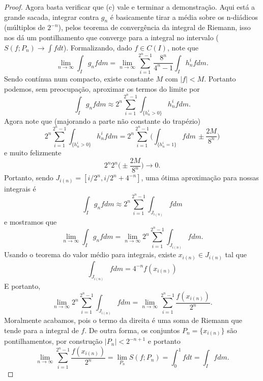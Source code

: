 \begin{proof}
    Agora basta verificar que (c) vale e terminar a demonstração. Aqui está a grande sacada, integrar contra $g_n$ é basicamente tirar a média 
    sobre os n-diádicos (múltiplos de $2^{-n}$), pelos teorema de convergência da integral de Riemann, isso nos dá um pontilhamento que converge para 
    a integral no intervalo ($S(f;P_n) \to \int f dt$).  Formalizando, dado $f \in C(I)$, note que
    $$\lim_{n\to\infty} \int_I g_nf dm = \lim_{n\to\infty} \sum_{i=1}^{2^n - 1} \frac{8^n}{4^n - 1} \int_I h_n^i fdm.$$
    Sendo contínua num compacto, existe constante $M$ com $|f| < M$. Portanto podemos, sem preocupação, aproximar os termos do limite por 
    $$\int_I g_nf dm \approx 2^n \sum_{i=1}^{2^n - 1} \int_{\{h_n^i > 0\}} h_n^i fdm.$$
    Agora note que (majorando a parte não constante do trapézio)
    $$2^n \sum_{i=1}^{2^n - 1} \int_{\{h_n^i > 0\}} h_n^i fdm = 2^n  \sum_{i=1}^{2^n - 1} \bigg(\int_{\{h_n^i = 1\}} f dm \,\pm \frac{2M}{8^{n}} \bigg)$$
    e muito felizmente
    $$2^n 2^n \bigg( \pm \frac{2M}{8^n}\bigg) \to 0.$$
    Portanto, sendo $J_{i(n)} = [i/2^n, i/2^n + 4^{-n}]$, uma ótima aproximação para nossas integrais é 
    $$\int_I g_n fdm \approx 2^n \sum_{i=1}^{2^n - 1} \int_{J_{i(n)}} f dm$$
    e mostramos que
    $$\lim_{n\to\infty} \int_I g_n fdm = \lim_{n\to\infty} 2^n \sum_{i=1}^{2^n - 1} \int_{J_{i(n)}} f dm.$$
    Usando o teorema do valor médio para integrais, existe $x_{i(n)} \in J_{i(n)}$ tal que 
    $$\int_{J_{i(n)}} fdm = 4^{-n} f(x_{i(n)})$$
    E portanto,
    $$\lim_{n\to\infty} 2^n \sum_{i=1}^{2^n - 1} \int_{J_{i(n)}} f dm = \lim_{n\to\infty} \sum_{i=1}^{2^n - 1}\frac{f(x_{i(n)})}{2^n}.$$
    Moralmente acabamos, pois o termo da direita é uma soma de Riemann que tende para a integral de $f$. De outra forma,
    os conjuntos $P_n = \{x_{i(n)}\}$ são pontilhamentos, por construção $|P_n| < 2^{-n + 1}$ e portanto 
    $$\lim_{n\to\infty} \sum_{i=1}^{2^n - 1}\frac{f(x_{i(n)})}{2^n} = \lim_{P_n} S(f;P_n) = \int_{0}^{1} fdt = \int_I f dm.$$ 
\end{proof}

